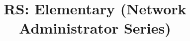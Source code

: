 \usepackage{multirow} %
\usepackage{collcell} %
\title{RS: Elementary \newline \newline (Network Administrator Series)}










